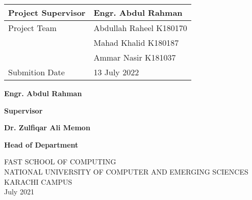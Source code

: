 \begin{titlepage}
    \begin{center}
        \vspace*{1cm}

        \begin{tabular}{ | m{5cm} | m{5cm} | }
            \hline
            Project Supervisor & \textbf{Engr. Abdul Rahman} \\ [1.5ex] 
            \hline
            Project Team & Abdullah Raheel K180170 \\ [1.5ex] 
             & Mahad Khalid K180187 \\ [1.5ex] 
             & Ammar Nasir K181037 \\ [1.5ex] 
            \hline
            Submition Date & 13 July 2022 \\ [1.5ex]
            \hline

          \end{tabular}

        \vspace{3cm}

        \Large
        \textbf{Engr. Abdul Rahman}
        \textunderscore \textunderscore \textunderscore \textunderscore \textunderscore \textunderscore \textunderscore
        \textunderscore \textunderscore \textunderscore \textunderscore \textunderscore \textunderscore \textunderscore
        \textunderscore \textunderscore \textunderscore \textunderscore \textunderscore \textunderscore \textunderscore
        \textunderscore \textunderscore \textunderscore \textunderscore \textunderscore \textunderscore \textunderscore
        \vspace{0.4cm}

        \large
        \textbf{Supervisor}
        \vspace{0.4cm}


        \vspace{2cm}

        \Large
        \textbf{Dr. Zulfiqar Ali Memon}
        \textunderscore \textunderscore \textunderscore \textunderscore \textunderscore \textunderscore \textunderscore
        \textunderscore \textunderscore \textunderscore \textunderscore \textunderscore \textunderscore \textunderscore
        \textunderscore \textunderscore \textunderscore \textunderscore \textunderscore \textunderscore \textunderscore
        \textunderscore \textunderscore \textunderscore \textunderscore \textunderscore \textunderscore
        \vspace{0.4cm}

        \large
        \textbf{Head of Department}
        \vspace{0.4cm}


      

        \vfill
        \normalsize
        FAST SCHOOL OF COMPUTING\\
        NATIONAL UNIVERSITY OF COMPUTER AND EMERGING SCIENCES\\
        KARACHI CAMPUS\\
        July 2021

    \end{center}
\end{titlepage}

